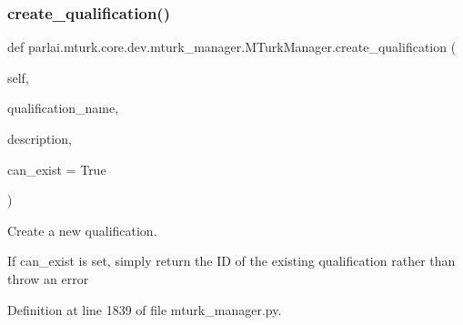 \subsubsection{\texorpdfstring{create\+\_\+qualification()}{create\_qualification()}}
{\footnotesize\ttfamily def parlai.\+mturk.\+core.\+dev.\+mturk\+\_\+manager.\+M\+Turk\+Manager.\+create\+\_\+qualification (\begin{DoxyParamCaption}\item[{}]{self,  }\item[{}]{qualification\+\_\+name,  }\item[{}]{description,  }\item[{}]{can\+\_\+exist = {\ttfamily True} }\end{DoxyParamCaption})}

\begin{DoxyVerb}Create a new qualification.

If can_exist is set, simply return the ID of the existing qualification rather
than throw an error
\end{DoxyVerb}
 

Definition at line 1839 of file mturk\+\_\+manager.\+py.


